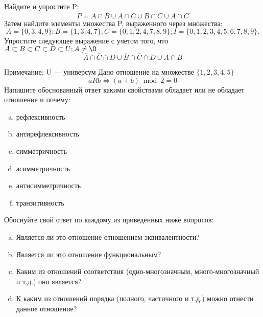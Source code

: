 \documentclass[10pt]{exam}
\begin{document}
\begin{questions}
\question
Найдите и упростите P:
\begin{equation*}
\overline{P} = A \cap \overline{B} \cup A \cap C \cup B \cap C \cup \overline{A} \cap C
\end{equation*}
Затем найдите элементы множества P, выраженного через множества:
\begin{equation*}
A = \{0, 3, 4, 9\}; 
B = \{1, 3, 4, 7\};
C = \{0, 1, 2, 4, 7, 8, 9\};
I = \{0, 1, 2, 3, 4, 5, 6, 7, 8, 9\}.
\end{equation*}\question
Упростите следующее выражение с учетом того, что $A\subset B \subset C \subset D \subset U; A \neq \O$
\begin{equation*}
\overline{A} \cap \overline{C} \cap D \cup \overline{B} \cap \overline{C} \cap D \cup A \cap B
\end{equation*}

Примечание: U — универсум\question
Дано отношение на множестве $\{1, 2, 3, 4, 5\}$ 
\begin{equation*}
aRb \iff (a+b) \bmod 2 =0
\end{equation*}
Напишите обоснованный ответ какими свойствами обладает или не обладает отношение и почему:   
\begin{enumerate} [a)]\setcounter{enumi}{0}
\item рефлексивность
\item антирефлексивность
\item симметричность
\item асимметричность
\item антисимметричность
\item транзитивность
\end{enumerate}

Обоснуйте свой ответ по каждому из приведенных ниже вопросов:
\begin{enumerate} [a)]\setcounter{enumi}{0}
    \item Является ли это отношение отношением эквивалентности?
    \item Является ли это отношение функциональным?
    \item Каким из отношений соответствия (одно-многозначным, много-многозначный и т.д.) оно является?
    \item К каким из отношений порядка (полного, частичного и т.д.) можно отнести данное отношение?
\end{enumerate}




\end{questions}
\end{document}
